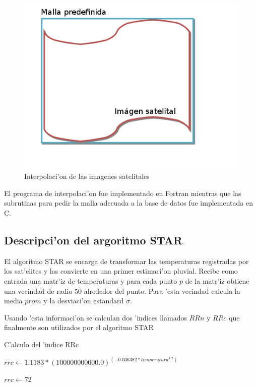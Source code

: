   \begin{figure}[h!]
  \centering
  \includegraphics[width=120mm,bb=0 0 502 388]{./imagenes/malla.jpg}
  \caption{Interpolaci'on de las imagenes satelitales}
  \end{figure}

  El programa de interpolaci'on fue implementado en Fortran mientras que las subrutinas para 
  pedir la malla adecuada a la base de datos fue implementada en C.

\subsection{Descripci'on del argoritmo STAR}
  El algoritmo STAR se encarga de transformar las temperaturas registradas por los sat'elites y las convierte
  en una primer estimaci'on pluvial. Recibe como entrada una matr'iz de temperaturas y para cada punto $p$ de la matr'iz
  obtiene una vecindad de radio $50$ alrededor del punto. Para 'esta vecindad calcula la media $prom$ y la desviaci'on estandard $\sigma$.

  Usando 'esta informaci'on se calculan dos 'indices llamados $RRn$ y $RRc$ que finalmente son utilizados por el algoritmo STAR

  \begin{algorithm}
  \caption{C'alculo del 'indice RRc}

  \begin{algorithmic}
	  \STATE $rrc \gets 1.1183* (100000000000.0)^(-0.036382*temperatura^{1.2})$
  \ELSE
	  
	  \STATE $rrc \gets 72$ 
	  
  \ENDIF 
  \end{algorithmic}
  \end{algorithm}

